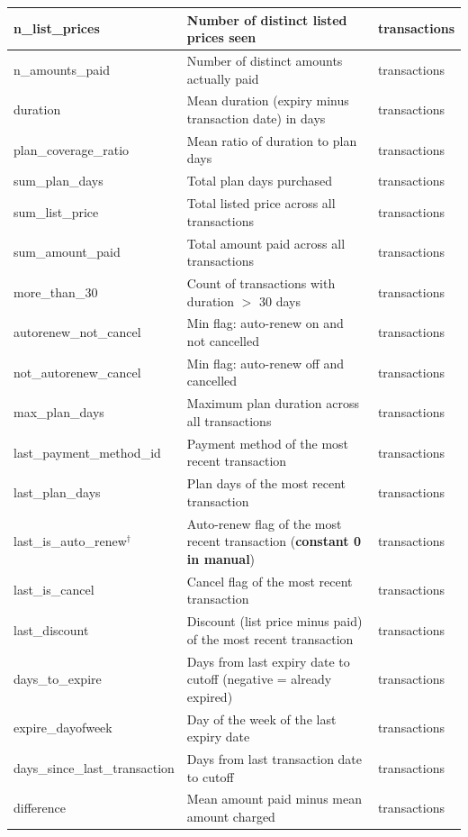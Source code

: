 \documentclass{article}
\begin{document}
\begin{longtable}{|l|p{7.5cm}|l|}
n\_list\_prices & Number of distinct listed prices seen & transactions \\ \hline
n\_amounts\_paid & Number of distinct amounts actually paid & transactions \\ \hline
duration & Mean duration (expiry minus transaction date) in days & transactions \\ \hline
plan\_coverage\_ratio & Mean ratio of duration to plan days & transactions \\ \hline
sum\_plan\_days & Total plan days purchased & transactions \\ \hline
sum\_list\_price & Total listed price across all transactions & transactions \\ \hline
sum\_amount\_paid & Total amount paid across all transactions & transactions \\ \hline
more\_than\_30 & Count of transactions with duration $>$ 30 days & transactions \\ \hline
autorenew\_not\_cancel & Min flag: auto-renew on and not cancelled & transactions \\ \hline
not\_autorenew\_cancel & Min flag: auto-renew off and cancelled & transactions \\ \hline
max\_plan\_days & Maximum plan duration across all transactions & transactions \\ \hline
last\_payment\_method\_id & Payment method of the most recent transaction & transactions \\ \hline
last\_plan\_days & Plan days of the most recent transaction & transactions \\ \hline
last\_is\_auto\_renew$^\dagger$ & Auto-renew flag of the most recent transaction (\textbf{constant 0 in manual}) & transactions \\ \hline
last\_is\_cancel & Cancel flag of the most recent transaction & transactions \\ \hline
last\_discount & Discount (list price minus paid) of the most recent transaction & transactions \\ \hline
days\_to\_expire & Days from last expiry date to cutoff (negative = already expired) & transactions \\ \hline
expire\_dayofweek & Day of the week of the last expiry date & transactions \\ \hline
days\_since\_last\_transaction & Days from last transaction date to cutoff & transactions \\ \hline
difference & Mean amount paid minus mean amount charged & transactions \\ \hline

\end{longtable}
\end{document}
